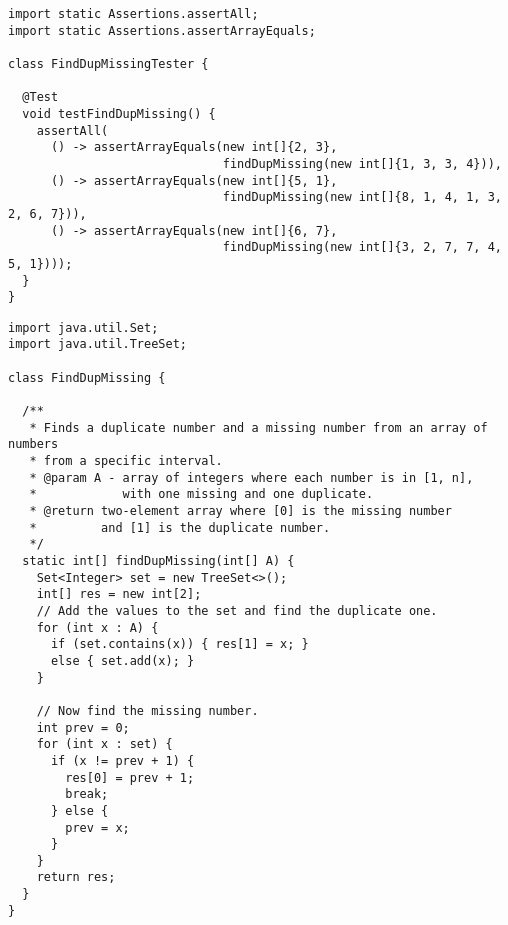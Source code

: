 
\begin{cl}[]{}
\begin{lstlisting}[language=MyJava]
import static Assertions.assertAll;
import static Assertions.assertArrayEquals;

class FindDupMissingTester {

  @Test
  void testFindDupMissing() {
    assertAll(
      () -> assertArrayEquals(new int[]{2, 3}, 
                              findDupMissing(new int[]{1, 3, 3, 4})),
      () -> assertArrayEquals(new int[]{5, 1}, 
                              findDupMissing(new int[]{8, 1, 4, 1, 3, 2, 6, 7})),
      () -> assertArrayEquals(new int[]{6, 7}, 
                              findDupMissing(new int[]{3, 2, 7, 7, 4, 5, 1})));
  }
}
\end{lstlisting}
\end{cl}

\begin{cl}[]{}
\begin{lstlisting}[language=MyJava]
import java.util.Set;
import java.util.TreeSet;

class FindDupMissing {

  /**
   * Finds a duplicate number and a missing number from an array of numbers
   * from a specific interval.
   * @param A - array of integers where each number is in [1, n],
   *            with one missing and one duplicate.
   * @return two-element array where [0] is the missing number
   *         and [1] is the duplicate number.
   */
  static int[] findDupMissing(int[] A) {
    Set<Integer> set = new TreeSet<>();
    int[] res = new int[2];
    // Add the values to the set and find the duplicate one.
    for (int x : A) {
      if (set.contains(x)) { res[1] = x; } 
      else { set.add(x); }
    }

    // Now find the missing number.
    int prev = 0;
    for (int x : set) {
      if (x != prev + 1) {
        res[0] = prev + 1;
        break;
      } else {
        prev = x;
      }
    }
    return res;
  }
}
\end{lstlisting}
\end{cl}

